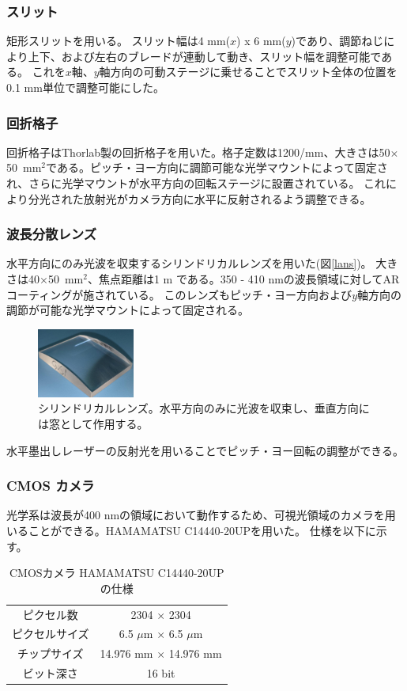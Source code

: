 \documentclass[a4paper,11pt,uplatex]{jsbook}
\begin{document}
\subsubsection{スリット}
矩形スリットを用いる。
スリット幅は4 mm($x$) x 6 mm($y$)であり、調節ねじにより上下、および左右のブレードが連動して動き、スリット幅を調整可能である。
これを$x$軸、$y$軸方向の可動ステージに乗せることでスリット全体の位置を0.1 mm単位で調整可能にした。

\subsubsection{回折格子}
回折格子はThorlab製の回折格子\cite{grating}を用いた。格子定数は1200/mm、大きさは50$\times$50~mm$^2$である。ピッチ・ヨー方向に調節可能な光学マウントによって固定され、さらに光学マウントが水平方向の回転ステージに設置されている。
これにより分光された放射光がカメラ方向に水平に反射されるよう調整できる。

\subsubsection{波長分散レンズ}
水平方向にのみ光波を収束するシリンドリカルレンズを用いた(図\ref{lans})。
大きさは40$\times$50~mm$^2$、焦点距離は1 m である。350 - 410 nmの波長領域に対してARコーティングが施されている。
このレンズもピッチ・ヨー方向および$y$軸方向の調節が可能な光学マウントによって固定される。
\begin{figure}[h]
  \centering
  \includegraphics[width=0.4\linewidth]{image/3-lens.png}
  \caption[シリンドリカルレンズ]{シリンドリカルレンズ。水平方向のみに光波を収束し、垂直方向には窓として作用する。}
  \label{lens}
\end{figure}
水平墨出しレーザーの反射光を用いることでピッチ・ヨー回転の調整ができる。

\subsubsection{CMOS カメラ}
光学系は波長が400 nmの領域において動作するため、可視光領域のカメラを用いることができる。HAMAMATSU C14440-20UPを用いた。
仕様を以下に示す。
\begin{table}[h]
\centering
\begin{tabular}{c|c}
  ピクセル数 & 2304 $\times$ 2304\\
  ピクセルサイズ & 6.5 $\mu$m $\times$ 6.5 $\mu$m\\
  チップサイズ & 14.976 mm $\times$ 14.976 mm\\
  ビット深さ & 16 bit\\ 
\end{tabular}
\caption[CMOSカメラの仕様]{CMOSカメラ HAMAMATSU C14440-20UP の仕様}
\end{table}
\end{document}
